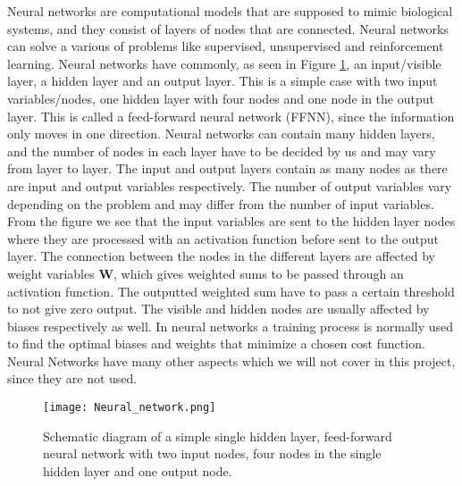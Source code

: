 \documentclass[12pt,a4paper,english]{article}
\begin{document}
Neural networks are computational models that are supposed to mimic biological systems, and they consist of layers of nodes that are connected. Neural networks can solve a various of problems like supervised, unsupervised and reinforcement learning. Neural networks have commonly, as seen in Figure \ref{fig:Neural_network}, an input/visible layer, a hidden layer and an output layer. This is a simple case with two input variables/nodes, one hidden layer with four nodes and one node in the output layer. This is called a feed-forward neural network (FFNN), since the information only moves in one direction. Neural networks can contain many hidden layers, and the number of nodes in each layer have to be decided by us and may vary from layer to layer. The input and output layers contain as many nodes as there are input and output variables respectively. The number of output variables vary depending on the problem and may differ from the number of input variables. From the figure we see that the input variables are sent to the hidden layer nodes where they are processed with an activation function before sent to the output layer. The connection between the nodes in the different layers are affected by weight variables \textbf{W}, which gives weighted sums to be passed through an activation function. The outputted weighted sum have to pass a certain threshold to not give zero output. The visible and hidden nodes are usually affected by biases respectively as well. In neural networks a training process is normally used to find the optimal biases and weights that minimize a chosen cost function. Neural Networks have many other aspects which we will not cover in this project, since they are not used.

\begin{figure}[htbp]
	\centering\texttt{[image: Neural\_network.png]}
	\caption{Schematic diagram of a simple single hidden layer, feed-forward neural network with two input nodes, four nodes in the single hidden layer and one output node.\label{fig:Neural_network}}
\end{figure} 
\end{document}

